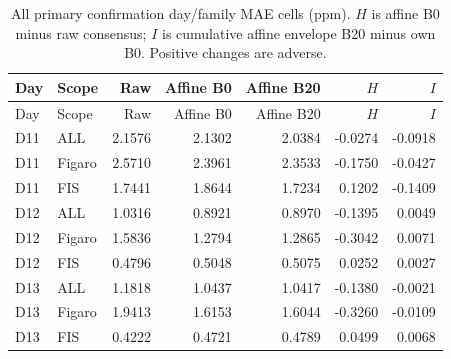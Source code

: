 \small\setlength{\tabcolsep}{4pt}
\begin{longtable}{llrrrrr}
\caption{All primary confirmation day/family MAE cells (ppm). $H$ is affine B0 minus raw consensus; $I$ is cumulative affine envelope B20 minus own B0. Positive changes are adverse.}\label{tab:sc5mae}\\
\toprule
Day & Scope & Raw & Affine B0 & Affine B20 & $H$ & $I$ \\ \midrule\endfirsthead
\toprule
Day & Scope & Raw & Affine B0 & Affine B20 & $H$ & $I$ \\ \midrule\endhead
\bottomrule\endfoot
D11 & ALL & 2.1576 & 2.1302 & 2.0384 & -0.0274 & -0.0918 \\
D11 & Figaro & 2.5710 & 2.3961 & 2.3533 & -0.1750 & -0.0427 \\
D11 & FIS & 1.7441 & 1.8644 & 1.7234 & 0.1202 & -0.1409 \\
D12 & ALL & 1.0316 & 0.8921 & 0.8970 & -0.1395 & 0.0049 \\
D12 & Figaro & 1.5836 & 1.2794 & 1.2865 & -0.3042 & 0.0071 \\
D12 & FIS & 0.4796 & 0.5048 & 0.5075 & 0.0252 & 0.0027 \\
D13 & ALL & 1.1818 & 1.0437 & 1.0417 & -0.1380 & -0.0021 \\
D13 & Figaro & 1.9413 & 1.6153 & 1.6044 & -0.3260 & -0.0109 \\
D13 & FIS & 0.4222 & 0.4721 & 0.4789 & 0.0499 & 0.0068 \\
\end{longtable}\normalsize
